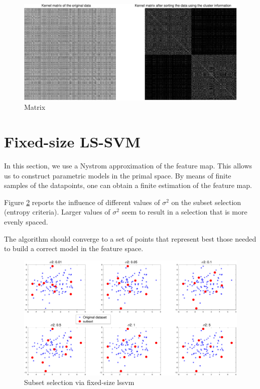 \documentclass[11pt, a4paper]{article}
\begin{document}
\begin{figure}[H]
  \centering
  \includegraphics[scale=.35]{scluster_matrix.pdf}
  \caption{Matrix}
  \label{fig:sclustering_matrix}
\end{figure}

\section{Fixed-size LS-SVM}

In this section, we use a Nystrom approximation of the feature
map. This allows us to construct parametric models in the primal
space. By means of finite samples of the datapoints, one can obtain a
finite estimation of the feature map.

Figure \ref{fig:fslssvm_sig2} reports the influence of different
values of $\sigma^2$ on the subset selection (entropy
criteria). Larger values of $\sigma^2$ seem to result in a selection
that is more evenly spaced.

The algorithm should converge to a set of points that represent best
those needed to build a correct model in the feature space.

\begin{figure}[H]
  \centering
  \includegraphics[scale=.35]{fslssvm_sig2.pdf}
  \caption{Subset selection via fixed-size lssvm}
  \label{fig:fslssvm_sig2}
\end{figure}
\end{document}
